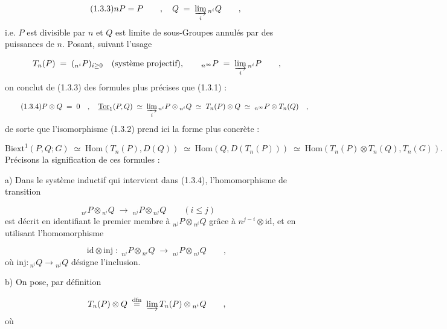 \begin{equation}\tag{1.3.3}
nP=P \qquad , \quad Q \;=\; \varinjlim_i {}_{n^i}Q \qquad ,
\end{equation}
i.e. $P$ est divisible par $n$ et $Q$ est limite de sous-Groupes annulés par des puissances de $n$. Posant, suivant l'usage

\begin{equation*}
T_n(P) \;=\; ({}_{n^i}P)_{i \geq 0} \quad (\text{système projectif}), \qquad {}_{n^\infty}P \;=\; \varinjlim_i {}_{n^i}P \qquad ,
\end{equation*}
on conclut de (1.3.3) des formules plus précises que (1.3.1) :

\begin{equation}\tag{1.3.4}
P \otimes Q \;=\; 0 \quad , \quad \underline{\mathrm{Tor}}_1(P,Q) \;\simeq\; \varinjlim_i {}_{n^i}P \otimes {}_{n^i}Q \;\simeq\; T_n(P) \otimes Q \;\simeq\; {}_{n^\infty}P \otimes T_n(Q) \quad ,
\end{equation}
de sorte que l'isomorphisme (1.3.2) prend ici la forme plus concrète :

\begin{equation}\tag{1.3.5}
\mathrm{Biext}^1(P,Q;G) \;\simeq\; \mathrm{Hom}(T_n(P),D(Q)) \;\simeq\; \mathrm{Hom}(Q,D(T_n(P))) \;\simeq\; \mathrm{Hom}(T_n(P) \otimes T_n(Q),T_n(G)).
\end{equation}
Précisons la signification de ces formules :

a)  Dans le système inductif qui intervient dans (1.3.4), l'homomorphisme de transition

\begin{equation*}
{}_{n^i}P \otimes {}_{n^i}Q \;\longrightarrow\; {}_{n^j}P \otimes {}_{n^j}Q \qquad (i \leq j) \qquad 
\end{equation*}
 est décrit en identifiant le premier membre à ${}_{n^j}P \otimes {}_{n^i}Q$ grâce à $n^{j-i} \otimes \mathrm{id}$, et en utilisant l'homomorphisme

\begin{equation*}
\mathrm{id} \otimes \mathrm{inj} \;:\; {}_{n^j}P \otimes {}_{n^i}Q \;\longrightarrow\; {}_{n^j}P \otimes {}_{n^j}Q \qquad ,
\end{equation*}
où $\mathrm{inj} : {}_{n^i}Q \longrightarrow {}_{n^j}Q$ désigne l'inclusion.

b)  On pose, par définition

\begin{equation*}
T_n(P) \otimes Q \;\overset{\mathrm{dfn}}{=}\; \varinjlim T_n(P) \otimes {}_{n^i}Q \qquad ,
\end{equation*}
où


